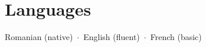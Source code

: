 \hypertarget{languages}{%
\section{Languages}\label{languages}}

Romanian {\color{secondary}\small (native)} \,\ensuremath{\cdot}\, English {\color{secondary}\small (fluent)} \,\ensuremath{\cdot}\, French {\color{secondary}\small (basic)}
